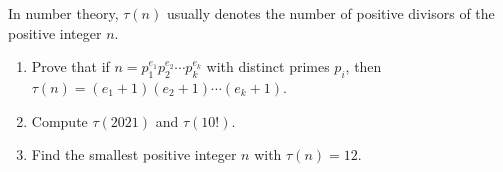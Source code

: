 In number theory, $\tau(n)$ usually denotes the number of positive divisors of the positive integer $n$.
\begin{enumerate}
\item[(a)] Prove that if $n=p_1^{e_1}p_2^{e_2}\cdots p_k^{e_k}$ with distinct primes $p_i$, then $\tau(n)=(e_1+1)(e_2+1)\cdots(e_k+1)$.
\item[(b)] Compute $\tau(2021)$ and $\tau(10!)$.
\item[(c)] Find the smallest positive integer $n$ with $\tau(n)=12$.
\end{enumerate}
